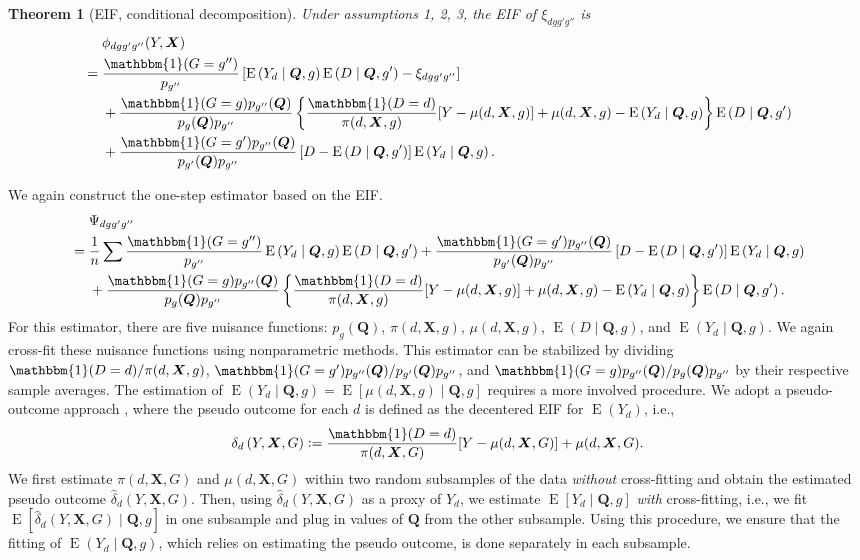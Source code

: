 \documentclass[12pt,a4paper]{article}
\newtheorem{prop}{Theorem}
\newcommand{\E}{\operatorname{E}}
\def\X{{\boldsymbol X}}
\def\Q{{\boldsymbol Q}}
\def\one{\mathbbm{1}}
\newcommand{\defeq}{\vcentcolon=}
\begin{document}
\begin{prop}[EIF, conditional decomposition]
Under assumptions 1, 2, 3, the EIF of $\xi_{dgg'g''}$ is 
\begin{align*}
     &\phantom{{}={}} \phi_{dgg'g''}(Y,\X) \\
    &=\frac{\one(G=g'')}{p_{g''}} \left[ \E \left(Y_d \mid \Q, g \right) \E \left(D \mid \Q, g' \right) - \xi_{dgg'g''} \right] \\
    &\phantom{{}={}} + \frac{\one(G=g) p_{g''}(\Q)}{p_g(\Q)p_{g''}} \left\{ \frac{\one(D=d)}{\pi(d,\X,g)} [Y-\mu(d,\X,g)]+\mu(d,\X,g) - \E \left(Y_d \mid \Q,g \right) \right\} \E \left(D \mid \Q,g' \right) \\
    &\phantom{{}={}} + \frac{\one(G=g')p_{g''}(\Q)}{p_{g'}(\Q)p_{g''}} \left[ D-\E \left(D \mid \Q, g' \right) \right] \E\left( Y_d \mid \Q, g \right).
\end{align*}
\end{prop}
We again construct the one-step estimator based on the EIF. 
\begin{align*}
    &\phantom{{}={}} \Psi_{dgg'g''} \\
    &=\frac{1}{n} \sum \frac{\one(G=g'')}{p_{g''}} \E \left(Y_d \mid \Q, g \right) \E \left(D \mid \Q, g' \right) + \frac{\one(G=g')p_{g''}(\Q)}{p_{g'}(\Q)p_{g''}} \left[ D-\E \left(D \mid \Q, g' \right) \right] \E\left( Y_d \mid \Q, g \right) \\
    &\phantom{{}={}} + \frac{\one(G=g) p_{g''}(\Q)}{p_g(\Q)p_{g''}} \left\{ \frac{\one(D=d)}{\pi(d,\X,g)} [Y-\mu(d,\X,g)]+\mu(d,\X,g) - \E \left(Y_d \mid \Q,g \right) \right\} \E \left(D \mid \Q,g' \right).
\end{align*}
For this estimator, there are five nuisance functions: $p_g(\Q)$, $\pi(d,\X,g)$, $\mu(d,\X,g)$, $\E(D \mid \Q, g)$, and $\E(Y_d \mid \Q,g)$. We again cross-fit these nuisance functions using nonparametric methods. This estimator can be stabilized by dividing $\one(D=d)/\pi(d,\X,g)$, $\one(G=g')p_{g''}(\Q)/p_{g'}(\Q)p_{g''}$, and $\one(G=g)p_{g''}(\Q)/p_g(\Q)p_{g''}$ by their respective sample averages. The estimation of $\E(Y_d \mid \Q,g)=\E[\mu(d,\X,g) \mid \Q,g]$ requires a more involved procedure. We adopt a pseudo-outcome approach \citep[e.g.,][]{van_der_laan_statistical_2006,semenova_debiased_2021}, where the pseudo outcome for each $d$ is defined as the decentered EIF for $\E(Y_d)$, i.e., 
$$ \delta_d \left(Y, \X,  G \right) \defeq \frac{\one(D=d)}{\pi(d, \X,G)} [Y-\mu(d,\X,G)] + \mu(d,\X,G).$$
We first estimate $\pi(d, \X,G)$ and $\mu(d,\X,G)$ within two random subsamples of the data \emph{without} cross-fitting and obtain the estimated pseudo outcome $\hat{\delta}_d \left(Y, \X,  G \right)$. Then, using $\hat{\delta}_d \left(Y, \X,  G \right)$ as a proxy of $Y_d$, we estimate $\E\left[Y_d \mid \Q, g \right]$ \emph{with} cross-fitting, i.e., we fit $\E\left[\hat{\delta}_d \left(Y, \X,  G \right) \mid \Q, g \right]$ in one subsample and plug in values of $\Q$ from the other subsample. Using this procedure, we ensure that the fitting of $\E(Y_d \mid \Q,g)$, which relies on estimating the pseudo outcome, is done separately in each subsample. 
\end{document}
